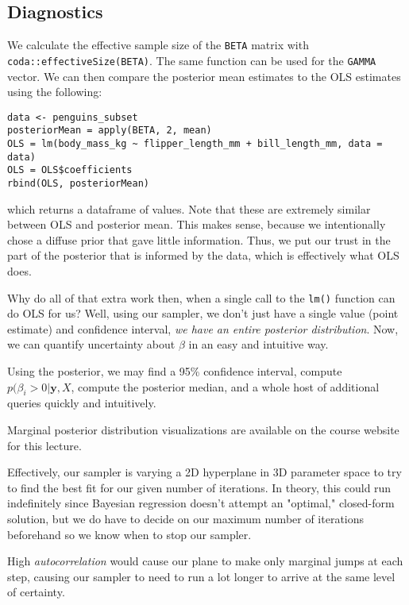 \documentclass[titlepage, 12pt, leqno]{article}
\begin{document}
\subsection{Diagnostics}
We calculate the effective sample size of the \texttt{BETA} matrix with
\texttt{coda::effectiveSize(BETA)}. The same function can be used for the
\texttt{GAMMA} vector. We can then compare the posterior mean estimates to the
OLS estimates using the following:
\begin{verbatim}
data <- penguins_subset
posteriorMean = apply(BETA, 2, mean)
OLS = lm(body_mass_kg ~ flipper_length_mm + bill_length_mm, data = data) 
OLS = OLS$coefficients
rbind(OLS, posteriorMean)
\end{verbatim}
which returns a dataframe of values. Note that these are extremely similar 
between OLS and posterior mean. This makes sense, because we intentionally
chose a diffuse prior that gave little information. Thus, we put our trust
in the part of the posterior that is informed by the data, which is effectively
what OLS does.

Why do all of that extra work then, when a single call to the \texttt{lm()} 
function can do OLS for us? Well, using our sampler, we don't just have a 
single value (point estimate) and confidence interval, \textit{we have an 
entire posterior distribution}. Now, we can quantify uncertainty about $\beta$
in an easy and intuitive way.

Using the posterior, we may find a 95\% confidence interval, compute
$p(\beta_{i}>0 | \textbf{y},X$, compute the posterior median, and a whole host
of additional queries quickly and intuitively.
\begin{note}
    Marginal posterior distribution visualizations are available on the course
    website for this lecture.
\end{note}

Effectively, our sampler is varying a 2D hyperplane in 3D parameter space to
try to find the best fit for our given number of iterations. In theory, this
could run indefinitely since Bayesian regression doesn't attempt an "optimal,"
closed-form solution, but we do have to decide on our maximum number of
iterations beforehand so we know when to stop our sampler.
\begin{note}
    High \textit{autocorrelation} would cause our plane to make only marginal
    jumps at each step, causing our sampler to need to run a lot longer to
    arrive at the same level of certainty.
\end{note}
\end{document}
